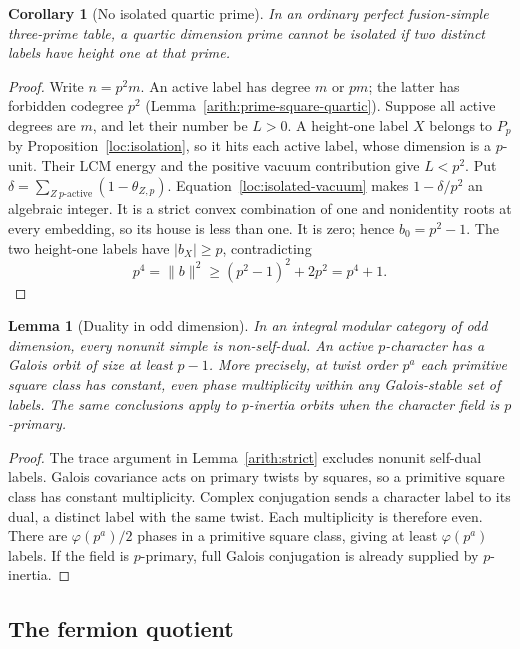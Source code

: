 \documentclass[11pt,a4paper]{article}
\numberwithin{equation}{section}
\newtheorem{lemma}[theorem]{Lemma}
\newtheorem{corollary}[theorem]{Corollary}
\begin{document}
\begin{corollary}[No isolated quartic prime]\label{loc:isolated-quartic}
In an ordinary perfect fusion-simple three-prime table, a quartic
dimension prime cannot be isolated if two distinct labels have height
one at that prime.
\end{corollary}
\begin{proof}
Write $n=p^2m$. An active label has degree $m$ or $pm$;
the latter has forbidden codegree $p^2$
(Lemma~\ref{arith:prime-square-quartic}). Suppose all active
degrees are $m$, and let their number be $L>0$. A height-one label
$X$ belongs to $P_p$ by Proposition~\ref{loc:isolation}, so it hits
each active label, whose dimension is a $p$-unit. Their LCM energy
and the positive vacuum contribution give $L<p^2$. Put
$\delta=\sum_{Z\ p\text{-active}}(1-\theta_{Z,p})$.
Equation~\eqref{loc:isolated-vacuum} makes $1-\delta/p^2$ an
algebraic integer. It is a strict convex combination of one and
nonidentity roots at every embedding, so its house is less than one.
It is zero; hence $b_0=p^2-1$. The two height-one labels have
$|b_X|\ge p$, contradicting
\[
              p^4=\|b\|^2\ge(p^2-1)^2+2p^2=p^4+1.
\]
\end{proof}

\begin{lemma}[Duality in odd dimension]\label{loc:odd-duality}
In an integral modular category of odd dimension, every nonunit
simple is non-self-dual. An active $p$-character has a Galois orbit
of size at least $p-1$. More precisely, at twist order $p^a$ each
primitive square class has constant, even phase multiplicity within
any Galois-stable set of labels. The same conclusions apply to
$p$-inertia orbits when the character field is $p$-primary.
\end{lemma}
\begin{proof}
The trace argument in Lemma~\ref{arith:strict} excludes
nonunit self-dual labels. Galois covariance acts on primary twists by
squares, so a primitive square class has constant multiplicity.
Complex conjugation sends a character label to its dual, a distinct
label with the same twist. Each multiplicity is therefore even.
There are $\varphi(p^a)/2$ phases in a primitive square class,
giving at least $\varphi(p^a)$ labels. If the field is $p$-primary,
full Galois conjugation is already supplied by $p$-inertia.
\end{proof}

\subsection{The fermion quotient}\label{loc:fermion-section}
\end{document}
